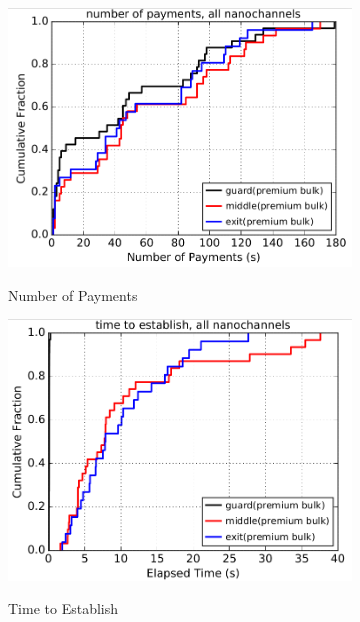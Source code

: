 \begin{figure} \centering
	\begin{subfigure}[t]{0.32\textwidth} \centering
\includegraphics[scale=0.2]{images/numpayments_temp.png}
		\label{fig:payments_a}
		\caption{Number of Payments}
	\end{subfigure}
	\begin{subfigure}[t]{0.32\textwidth} \centering
\includegraphics[scale=0.2]{images/ttestablish_temp.png}
		\label{fig:payments_b}
		\caption{Time to Establish}
	\end{subfigure}
	\begin{subfigure}[t]{0.32\textwidth} \centering

\end{subfigure}
\end{figure}
